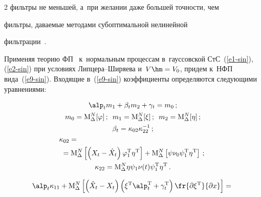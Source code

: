 \begin{multicols}{2}
фильтры не меньшей, а~при желании даже большей точности, чем

фильтры, даваемые методами субоптимальной нелинейной

фильтрации~\cite{1-sin, 6-sin, 8-sin}.



Применяя теорию ФП~\cite{1-sin} к~нормальным процессам в~гауссовской СтС~(\ref{e1-sin}), (\ref{e2-sin}) при условиях Лип\-це\-ра--Ши\-ря\-ева и~$V\hm=V_0$, придем к~НФП вида~(\ref{e9-sin}). Входящие в~(\ref{e9-sin}) коэффициенты определяются следующими уравнениями:

    \begin{gather}

    \alp_t m_1 + \beta_t m_2 + \gamma_t=m_0\,;\label{e10-sin}\\

   m_0 = \mathrm{M}^N_\Delta [\varphi]\,;\enskip m_1 = \mathrm{M}^N_\Delta  [\xi]\,;\enskip m_2 = \mathrm{M}^N_\Delta  [\eta]\,;\label{e11-sin}\\

\beta_t =\kappa_{02} \kappa_{22}^{-1}\,;\label{e12-sin}\\

  \kappa_{02} ={}\hspace*{63mm}\notag\\

   {}=\mathrm{M}^N_\Delta \left [\left(X_t - \hat{X}_t\right) \varphi_1^{\mathrm{T}} \eta^{\mathrm{T}}\right]+\mathrm{M}^N_\Delta \left[\psi  \nu_0\psi_1^{\mathrm{T}} \eta^{\mathrm{T}} \right]\,;\label{e12a-sin}\\

   \kappa_{22} = \mathrm{M}^N_\Delta  \eta \psi_1\nu(t) \psi_1^{\mathrm{T}} \eta^{\mathrm{T}}\,.\label{e13-sin}

   \end{gather}



\vspace*{-12pt}



   \noindent

   \begin{multline}

  \alp_t\kappa_{11} + \mathrm{M}^N_\Delta \left[ \left(\hat{X}_t-X_t\right)\left(\xi^{\mathrm{T}} \alp_t^{\mathrm{T}} +\gamma_t^{\mathrm{T}}\right)

\fr{\partial \xi^{\mathrm{T}}}{\partial x}\right]={}\\


\end{multline}
\end{multicols}
